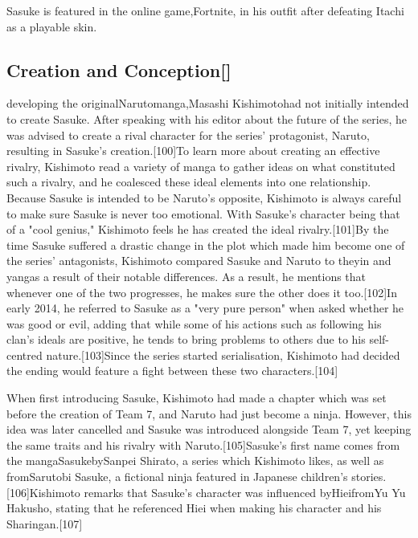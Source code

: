 \documentclass[a4paper,12pt]{article}
\begin{document}
Sasuke is featured in the online game,Fortnite, in his outfit after defeating Itachi as a playable skin.\\ \par \vspace{0.5cm}

\subsection*{Creation and Conception[]}\n\nWhen developing the originalNarutomanga,Masashi Kishimotohad not initially intended to create Sasuke. After speaking with his editor about the future of the series, he was advised to create a rival character for the series' protagonist, Naruto, resulting in Sasuke's creation.[100]To learn more about creating an effective rivalry, Kishimoto read a variety of manga to gather ideas on what constituted such a rivalry, and he coalesced these ideal elements into one relationship. Because Sasuke is intended to be Naruto's opposite, Kishimoto is always careful to make sure Sasuke is never too emotional. With Sasuke's character being that of a "cool genius," Kishimoto feels he has created the ideal rivalry.[101]By the time Sasuke suffered a drastic change in the plot which made him become one of the series' antagonists, Kishimoto compared Sasuke and Naruto to theyin and yangas a result of their notable differences. As a result, he mentions that whenever one of the two progresses, he makes sure the other does it too.[102]In early 2014, he referred to Sasuke as a "very pure person" when asked whether he was good or evil, adding that while some of his actions such as following his clan's ideals are positive, he tends to bring problems to others due to his self-centred nature.[103]Since the series started serialisation, Kishimoto had decided the ending would feature a fight between these two characters.[104]\\ \par \vspace{0.5cm}

When first introducing Sasuke, Kishimoto had made a chapter which was set before the creation of Team 7, and Naruto had just become a ninja. However, this idea was later cancelled and Sasuke was introduced alongside Team 7, yet keeping the same traits and his rivalry with Naruto.[105]Sasuke's first name comes from the mangaSasukebySanpei Shirato, a series which Kishimoto likes, as well as fromSarutobi Sasuke, a fictional ninja featured in Japanese children's stories.[106]Kishimoto remarks that Sasuke's character was influenced byHieifromYu Yu Hakusho, stating that he referenced Hiei when making his character and his Sharingan.[107]\\ \par \vspace{0.5cm}
\end{document}
